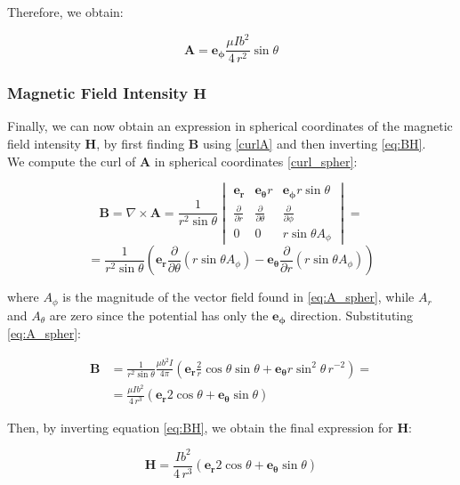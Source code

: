 Therefore, we obtain:

\begin{equation}
    \mathbf{A} = \mathbf{e_\phi} \frac{\mu I b^2}{4 \, r^2} 
    \sin \theta
    \label{eq:A_spher}
\end{equation}

\subsubsection{Magnetic Field Intensity $\mathbf{H}$}
Finally, we can now obtain an expression in spherical 
coordinates of the magnetic field intensity 
$\mathbf{H}$, by first finding $\mathbf{B}$ using 
\ref{curlA} and then inverting \ref{eq:BH}.
\\
We compute the curl of $\mathbf{A}$ in spherical 
coordinates \ref{curl_spher}:

\[
    \mathbf{B} = \nabla \times \mathbf{A} = \frac{1}{r^2 \sin \theta} 
    \begin{vmatrix}
        \mathbf{e_r} & \mathbf{e_\theta} r & \mathbf{e_\phi} r \sin \theta \\
        \frac{\partial}{\partial r} & \frac{\partial}{\partial \theta} & 
        \frac{\partial}{\partial \phi} \\
        0 & 0 & r \sin \theta A_\phi
    \end{vmatrix} =
\]
\[
    = \frac{1}{r^2 \sin \theta} \left( \mathbf{e_r} 
    \frac{\partial}{\partial \theta} (r \sin \theta A_\phi) 
    - \mathbf{e_\theta} \frac{\partial}{\partial r} 
    (r \sin \theta A_\phi) \right)
\]

where $A_\phi$ is the magnitude of the vector field 
found in \ref{eq:A_spher}, while $A_r$ and $A_\theta$ 
are zero since the potential has only the 
$\mathbf{e_\phi}$ direction. Substituting 
\ref{eq:A_spher}:

\[
\begin{aligned}
    \mathbf{B}&= \frac{1}{r^2 \sin \theta} 
    \frac{\mu b^2 I}{4 \pi} \left(\mathbf{e_r} 
    \frac{2}{r} \cos \theta \sin \theta + 
    \mathbf{e_\theta} r \sin^2 \theta \, r^{-2}\right) =
    \\
     &= \frac{\mu I b^2 }{4 \, r^3} \left( 
     \mathbf{e_r} 2 \cos \theta + \mathbf{e_\theta} 
     \sin \theta \right)
\end{aligned}
\]

Then, by inverting equation \ref{eq:BH}, we obtain the 
final expression for $\mathbf{H}$:

\begin{equation}
    \mathbf{H} = \frac{ I b^2}{4 \, r^3} \left( 
    \mathbf{e_r} 2 \cos \theta + \mathbf{e_\theta} 
    \sin \theta \right)
    \label{eq:H_spheric}
\end{equation}

